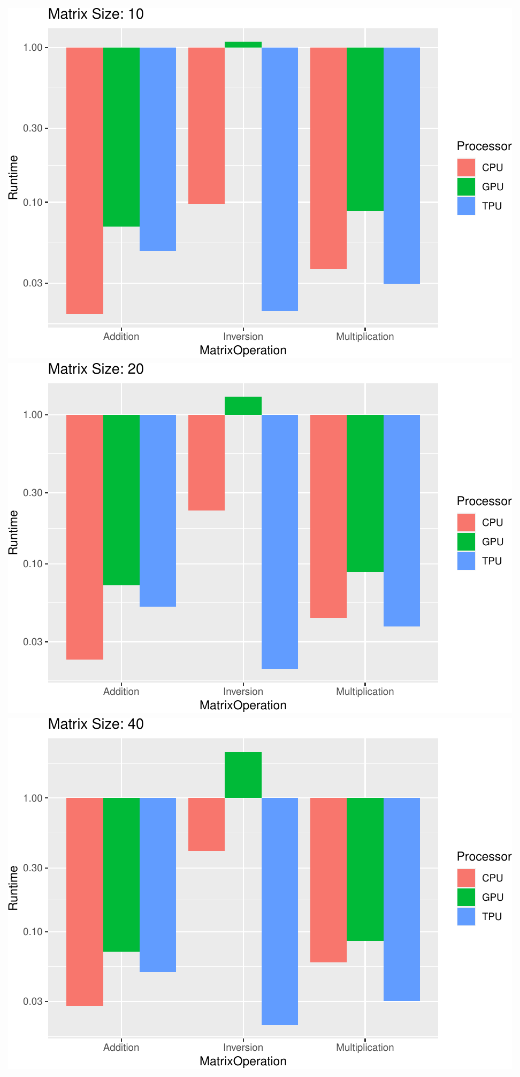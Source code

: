 \documentclass[
]{article}
\begin{document}
\includegraphics{main_files/figure-latex/unnamed-chunk-9-1.pdf}
\includegraphics{main_files/figure-latex/unnamed-chunk-9-2.pdf}
\includegraphics{main_files/figure-latex/unnamed-chunk-9-3.pdf}
\end{document}
